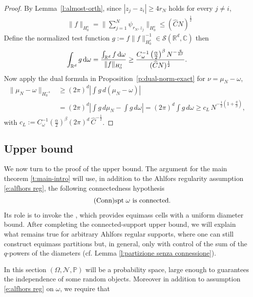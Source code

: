 \documentclass[12pt,a4paper,oneside]{amsart}
\theoremstyle{plain}
\theoremstyle{definition}
\numberwithin{equation}{section}
\numberwithin{figure}{section}
\numberwithin{table}{section}
\theoremstyle{remark}
\newcommand{\R}{\mathbb{R}}
\newcommand{\dd}{\textup{d}}
\newcommand{\Fhat}[1]{\widehat{#1}}
\newcommand{\expAhlfors}{\beta}
\begin{document}
\begin{proof}
By Lemma~\ref{l:almost-orth}, since $|z_j-z_i|\geq 4r_N$ holds for every $j\neq i$,
\begin{align*}
& \|f\|_{ H_0^s}=\big\|\sum_{j=1}^N\psi_{r_N,z_j}\big\|_{H_0^s} \leq (\Fhat{C}N)^{\frac12} 
\end{align*}
Define the normalized test function $g:=f\|f\|^{-1}_{H^s_0}\in \mathcal{S}(\R^d,\mathbb{C})$
then 
\begin{equation}\label{e:intg-lower}
\int_{\R^d} g\,\dd\omega = \frac{\int_{\R^d} f\,\dd\omega}{\|f\|_{H_0^s}}
\ge \frac{C^{-1}_\omega\left(\frac{ \alpha}{2}\right)^\expAhlfors N^{-\frac{q}{2\expAhlfors }}}{(\Fhat{C}N)^{\frac12}}.
\end{equation}
Now apply the dual formula in Proposition~\ref{p:dual-norm-exact} for $\nu=\mu_N-\omega$,
\begin{align*}
\|\mu_N-\omega\|_{H_0^{-s}}
&\ge (2\pi)^d\left|\int g\,d(\mu_N-\omega)\right|\\
&=(2\pi)^d\left|\int g\,d\mu_N-\int g\,d\omega\right|
=(2\pi)^d\int g\,d\omega
\ge c_L\,N^{-\frac{1}{2}(1+\frac{q}{\expAhlfors})},    
\end{align*}
with $c_L:=C^{-1}_{\omega}\left(\frac{ \alpha}{2}\right)^\expAhlfors  (2\pi)^d\,\Fhat{C}^{-\frac12}$.
\end{proof}



\subsection{Upper bound}\label{sec: upper bound}
We now turn to the proof of the upper bound. The argument for the main theorem \ref{t:main-intro}
will use, in addition to the Ahlfors regularity assumption \eqref{e:alfhors reg}, the
following connectedness hypothesis
\begin{equation}\tag{Conn}\label{e:supporto connesso}
    \textup{$\textup{spt} \; \omega$ is connected. 
}
\end{equation}
Its role is to invoke the \cite[Theorem 2]{GL17}, which provides equimass cells with a
uniform diameter bound. After completing the connected-support upper bound, we
will explain what remains true for arbitrary Ahlfors regular supports, where one can
still construct equimass partitions but, in general, only with control of the sum of the
$q$-powers of the diameters (cf. Lemma \ref{l:partizione senza connessione}).

In this section $(\Omega,\mathcal{N},\mathbb{P})$ will be a probability space, large enough to guarantees the independence of some random objects. Moreover in addition to assumption \eqref{e:alfhors reg} on $\omega$, we require that 
\end{document}
